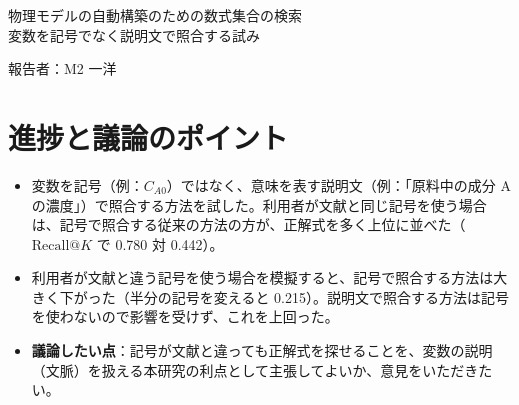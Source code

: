 \documentclass[a4j,dvipdfmx,10pt]{jresume}
\makeatletter
\newcommand{\rk}{\textrm{Recall@}K}
\makeatother
\begin{document}

\medskip
\begin{center}
  {\Large 物理モデルの自動構築のための数式集合の検索\\ 変数を記号でなく説明文で照合する試み}
\end{center}

\begin{flushright}
  報告者：M2\; 一洋 \\
\end{flushright}

\begin{abstract}
本研究の目的は、複数の情報源から収集した数式の中から、作りたいモデルに使える可能性の高い数式を提示する手法を開発することである。作成するモデルは、説明文と入出力変数で表される。提案手法は 2 段階の処理から構成される。第 1 段では、数式を説明文と式周辺の文章（\textbf{文脈}）の近さと入出力変数の重複率で採点し、上位 $N_1$ 件に絞る。第 2 段では、10 個の特徴量を持つ多層パーセプトロンで並べ直す。提案手法を 11{,}146 式と評価用の 1{,}823 ケースで評価した結果、上位 $K$ 件に入った正解式の割合 $\rk$（$K$ は正解式の数）は、第 1 段と同じ点数で全数式を並べる古典的な情報検索手法（最良の重み）の 0.607 から 0.780 に上がった。並べ直しでは、主に変数の重複率に基づく特徴量が効き、文脈の近さはほとんど効かなかった。
\end{abstract}

\section{進捗と議論のポイント}
\begin{itemize}[leftmargin=1.5em]
  \item 変数を記号（例：$C_{A0}$）ではなく、意味を表す説明文（例：「原料中の成分 A の濃度」）で照合する方法を試した。利用者が文献と同じ記号を使う場合は、記号で照合する従来の方法の方が、正解式を多く上位に並べた（$\rk$ で 0.780 対 0.442）。
  \item 利用者が文献と違う記号を使う場合を模擬すると、記号で照合する方法は大きく下がった（半分の記号を変えると 0.215）。説明文で照合する方法は記号を使わないので影響を受けず、これを上回った。
  \item \textbf{議論したい点}：記号が文献と違っても正解式を探せることを、変数の説明（文脈）を扱える本研究の利点として主張してよいか、意見をいただきたい。
\end{itemize}
\end{document}
